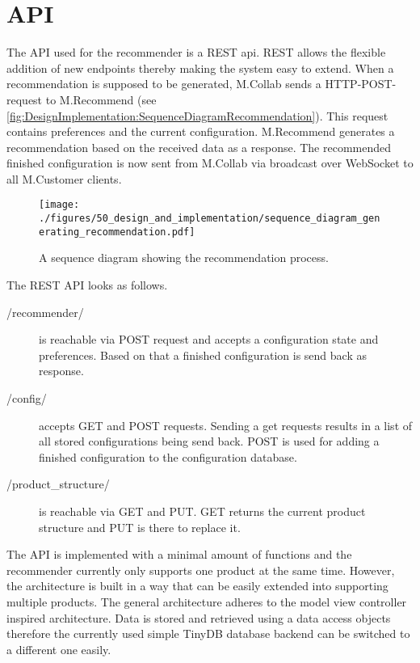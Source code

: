 \section{API}
\label{sec:DesignImplementation:API}

The API used for the recommender is a REST api. REST allows the flexible addition of new endpoints thereby making the system easy to extend.
When a recommendation is supposed to be generated, M.Collab sends a HTTP-POST-request to M.Recommend (see \autoref{fig:DesignImplementation:SequenceDiagramRecommendation}). This request contains preferences and the current configuration. M.Recommend generates a recommendation based on the received data as a response. The recommended finished configuration is now sent from  M.Collab via broadcast over WebSocket to all M.Customer clients. 

\begin{figure}
    \centering
    \texttt{[image: ./figures/50\_design\_and\_implementation/sequence\_diagram\_generating\_recommendation.pdf]}
    \caption{A sequence diagram showing the recommendation process.}
    \label{fig:DesignImplementation:SequenceDiagramRecommendation}
\end{figure}

The REST API looks as follows.

\begin{description}
    \item[/recommender/] is reachable via POST request and accepts a configuration state and preferences. Based on that a finished configuration is send back as response.
    \item[/config/] accepts GET and POST requests. Sending a get requests results in a list of all stored configurations being send back. POST is used for adding a finished configuration to the configuration database.
    \item[/product\_structure/] is reachable via GET and PUT. GET returns the current product structure and PUT is there to replace it.
\end{description}

The API is implemented with a minimal amount of functions and the recommender currently only supports one product at the same time. However, the architecture is built in a way that can be easily extended into supporting multiple products.
The general architecture adheres to the model view controller  inspired architecture.
Data is stored and retrieved using a data access objects therefore the currently used simple TinyDB database backend can be switched to a different one easily.

